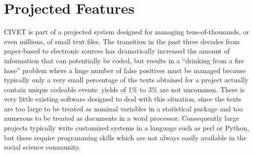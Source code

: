 \documentclass[letterpaper,10pt,english]{sphinxmanual}
\begin{document}
\chapter{Projected Features}
\label{future::doc}\label{future:projected-features}
CIVET is part of a projected system designed for managing
tens-of-thousands, or even millions, of small text files. The transition
in the past three decades from paper-based to electronic sources has
dramatically increased the amount of information that can potentially be
coded, but results in a “drinking from a fire hose” problem where a huge
number of false positives must be managed because typically only a very
small percentage of the texts obtained for a project actually contain
unique codeable events: yields of 1\% to 3\% are not uncommon. There is
very little existing software designed to deal with this situation,
since the texts are too large to be treated as nominal variables in a
statistical package and too numerous to be treated as documents in a
word processor. Consequently large projects typically write customized
systems in a language such as perl or Python, but these require
programming skills which are not always easily available in the social
science community.
\end{document}
